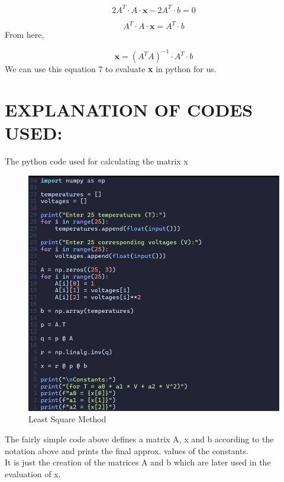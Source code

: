 \documentclass{article}
\begin{document}
\begin{equation}
    2 A^T\cdot A \cdot\textbf{x} - 2 A^T \cdot b = 0
\end{equation}

 \begin{equation}
     A^T\cdot A\cdot \textbf{x} = A^T \cdot b
 \end{equation}
From here,

\begin{equation}
    \textbf{x} = (A^T A)^{-1} \cdot A^T\cdot b 
\end{equation}
We can use this equation {7} to evaluate \textbf{x} in python for us.

\newpage

\section{EXPLANATION OF CODES USED:}

\begin{center}
    The python code used for calculating the matrix x
\end{center}
\begin{figure}[ht]
    \centering
    \includegraphics[width=0.8\linewidth]{image2.png}
    \caption{Least Square Method}
\end{figure}

The fairly simple code above defines a matrix A, x and b according to the notation above and prints the final approx. values of the constants.\\

It is just the creation of the matrices A and b which are later used in the evaluation of x.
\end{document}
